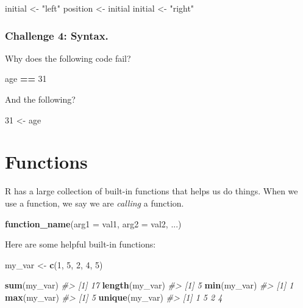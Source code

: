 \documentclass[
]{book}
\newenvironment{Shaded}{\begin{snugshade}}{\end{snugshade}}
\newcommand{\CommentTok}[1]{\textcolor[rgb]{0.56,0.35,0.01}{\textit{#1}}}
\newcommand{\DataTypeTok}[1]{\textcolor[rgb]{0.13,0.29,0.53}{#1}}
\newcommand{\DecValTok}[1]{\textcolor[rgb]{0.00,0.00,0.81}{#1}}
\newcommand{\KeywordTok}[1]{\textcolor[rgb]{0.13,0.29,0.53}{\textbf{#1}}}
\newcommand{\NormalTok}[1]{#1}
\newcommand{\OperatorTok}[1]{\textcolor[rgb]{0.81,0.36,0.00}{\textbf{#1}}}
\newcommand{\StringTok}[1]{\textcolor[rgb]{0.31,0.60,0.02}{#1}}
\begin{document}
\begin{Shaded}
\begin{Highlighting}[]
\NormalTok{initial <-}\StringTok{ "left"}
\NormalTok{position <-}\StringTok{ }\NormalTok{initial}
\NormalTok{initial <-}\StringTok{ "right"}
\end{Highlighting}
\end{Shaded}

\hypertarget{challenge-4-syntax.}{%
\subsubsection*{Challenge 4: Syntax.}\label{challenge-4-syntax.}}

Why does the following code fail?

\begin{Shaded}
\begin{Highlighting}[]
\NormalTok{age }\OperatorTok{==}\StringTok{ }\DecValTok{31}
\end{Highlighting}
\end{Shaded}

And the following?

\begin{Shaded}
\begin{Highlighting}[]
\DecValTok{31}\NormalTok{ <-}\StringTok{  }\NormalTok{age}
\end{Highlighting}
\end{Shaded}

\hypertarget{functions}{%
\section{Functions}\label{functions}}

R has a large collection of built-in functions that helps us do things. When we use a function, we say we are \emph{calling} a function.

\begin{Shaded}
\begin{Highlighting}[]
\KeywordTok{function_name}\NormalTok{(}\DataTypeTok{arg1 =}\NormalTok{ val1, }\DataTypeTok{arg2 =}\NormalTok{ val2, ...)}
\end{Highlighting}
\end{Shaded}

Here are some helpful built-in functions:

\begin{Shaded}
\begin{Highlighting}[]
\NormalTok{my_var <-}\StringTok{ }\KeywordTok{c}\NormalTok{(}\DecValTok{1}\NormalTok{, }\DecValTok{5}\NormalTok{, }\DecValTok{2}\NormalTok{, }\DecValTok{4}\NormalTok{, }\DecValTok{5}\NormalTok{)}

\KeywordTok{sum}\NormalTok{(my_var)}
\CommentTok{#> [1] 17}
\KeywordTok{length}\NormalTok{(my_var)}
\CommentTok{#> [1] 5}
\KeywordTok{min}\NormalTok{(my_var)}
\CommentTok{#> [1] 1}
\KeywordTok{max}\NormalTok{(my_var)}
\CommentTok{#> [1] 5}
\KeywordTok{unique}\NormalTok{(my_var)}
\CommentTok{#> [1] 1 5 2 4}
\end{Highlighting}
\end{Shaded}
\end{document}
